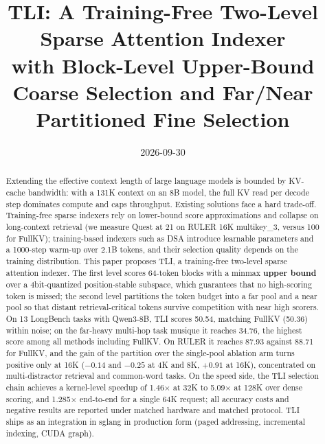 \documentclass[11pt]{article}
\title{TLI: A Training-Free Two-Level Sparse Attention Indexer\\
\large with Block-Level Upper-Bound Coarse Selection and Far/Near Partitioned Fine Selection}
\date{2026-09-30}
\begin{document}
\maketitle

\begin{abstract}
Extending the effective context length of large language models is bounded by KV-cache bandwidth: with a 131K context on an 8B model, the full KV read per decode step dominates compute and caps throughput. Existing solutions face a hard trade-off. Training-free sparse indexers rely on lower-bound score approximations and collapse on long-context retrieval (we measure Quest at 21 on RULER 16K multikey\_3, versus 100 for FullKV); training-based indexers such as DSA introduce learnable parameters and a 1000-step warm-up over 2.1B tokens, and their selection quality depends on the training distribution. This paper proposes TLI, a training-free two-level sparse attention indexer. The first level scores 64-token blocks with a minmax \textbf{upper bound} over a 4bit-quantized position-stable subspace, which guarantees that no high-scoring token is missed; the second level partitions the token budget into a far pool and a near pool so that distant retrieval-critical tokens survive competition with near high scorers. On 13 LongBench tasks with Qwen3-8B, TLI scores 50.54, matching FullKV (50.36) within noise; on the far-heavy multi-hop task musique it reaches 34.76, the highest score among all methods including FullKV. On RULER it reaches 87.93 against 88.71 for FullKV, and the gain of the partition over the single-pool ablation arm turns positive only at 16K ($-0.14$ and $-0.25$ at 4K and 8K, $+0.91$ at 16K), concentrated on multi-distractor retrieval and common-word tasks. On the speed side, the TLI selection chain achieves a kernel-level speedup of 1.46$\times$ at 32K to 5.09$\times$ at 128K over dense scoring, and 1.285$\times$ end-to-end for a single 64K request; all accuracy costs and negative results are reported under matched hardware and matched protocol. TLI ships as an integration in sglang in production form (paged addressing, incremental indexing, CUDA graph).
\end{abstract}

\end{document}
